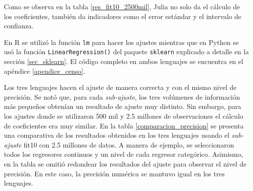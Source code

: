 Como se observa en la tabla \ref{res_fit10_2500mil}, \textsf{Julia} no solo da el cálculo de los coeficientes, también da indicadores como el error estándar y el intervalo de confianza. 

En \textsf{R} se utilizó la función \texttt{lm} para hacer los ajustes mientras que en \textsf{Python} se usó la función \texttt{LinearRegression()} del paquete \texttt{sklearn} explicado a detalle en la sección \ref{sec_sklearn}. El código completo en ambos lenguajes se encuentra en el apéndice \ref{apendice_censo}. 

Los tres lenguajes hacen el ajuste de manera correcta y con el mismo nivel de precisión. Se notó que, para cada \textit{sub-ajuste}, los tres volúmenes de información más pequeños obtenían un resultado de ajuste muy distinto. Sin embargo, para los ajustes donde se utilizaron 500 mil y 2.5 millones de observaciones el cálculo de coeficientes era muy similar. En la tabla \ref{comparacion_precision} se presenta una comparativa de los resultados obtenidos en los tres lenguajes usando el \textit{sub-ajuste} \textsf{fit10} con 2.5 millones de datos. A manera de ejemplo, se seleccionaron todos los regresores continuos y un nivel de cada regresor categórico. Asimismo, en la tabla se omitió redondear los resultados del ajuste para observar el nivel de precisión. En este caso, la precisión numérica se mantuvo igual en los tres lenguajes. 

